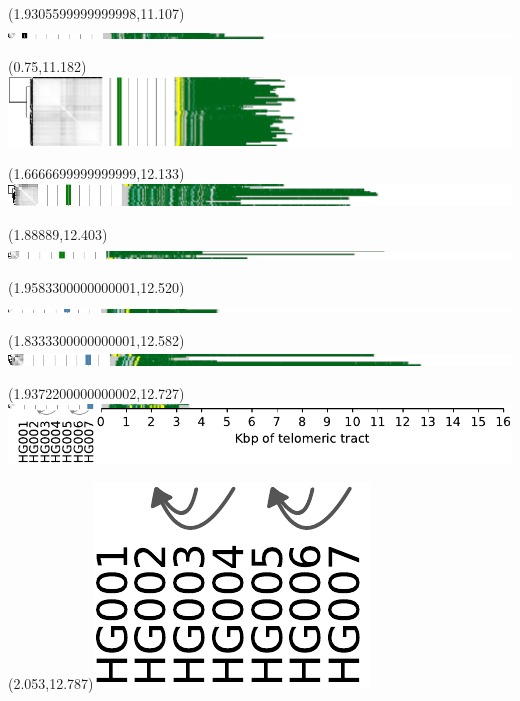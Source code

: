 \documentclass{article}
\begin{document}
\begin{textblock}{13}(1.9305599999999998,11.107)\includegraphics{./Figure_S5/18qtel_1-500K_1_12_12_rc-HG001.pdf}\end{textblock}
\begin{textblock}{13}(0.75,11.182)\includegraphics{./Figure_S5/18qtel_1-500K_1_12_12_rc-HG002.pdf}\end{textblock}
\begin{textblock}{13}(1.6666699999999999,12.133)\includegraphics{./Figure_S5/18qtel_1-500K_1_12_12_rc-HG003.pdf}\end{textblock}
\begin{textblock}{13}(1.88889,12.403)\includegraphics{./Figure_S5/18qtel_1-500K_1_12_12_rc-HG004.pdf}\end{textblock}
\begin{textblock}{13}(1.9583300000000001,12.520)\includegraphics{./Figure_S5/18qtel_1-500K_1_12_12_rc-HG005.pdf}\end{textblock}
\begin{textblock}{13}(1.8333300000000001,12.582)\includegraphics{./Figure_S5/18qtel_1-500K_1_12_12_rc-HG006.pdf}\end{textblock}
\begin{textblock}{13}(1.9372200000000002,12.727)\includegraphics{./Figure_S5/18qtel_1-500K_1_12_12_rc-HG007.pdf}\end{textblock}
\begin{textblock}{13}(2.053,12.787)\includegraphics[width=.868in,keepaspectratio]{Figure_4/fatter-arrows-labeled.pdf}\end{textblock}
\end{document}
